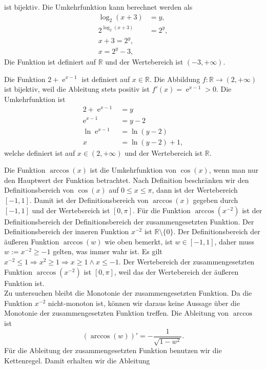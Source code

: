 {\begin{iii}
ist bijektiv.
Die Umkehrfunktion kann berechnet werden als
\begin{align*}
\log_2(x+3) &= y,\\
2^{\log_2(x+3)} & = 2^y,\\
x+3 = 2^y,\\
x = 2^y-3,
\end{align*}
Die Funktion ist definiert auf $\mathbb R$ und der Wertebereich ist $(-3, +\infty)$.
\item Die Funktion $2+\operatorname{e}^{x-1}$ ist definiert auf $x\in \mathbb R$. Die Abbildung $f: \mathbb R \to (2, +\infty)$ ist bijektiv,
weil die Ableitung stets positiv ist $f'(x) = \operatorname{e}^{x-1} > 0$.
%
Die Umkehrfunktion ist
\begin{align*}
2+\operatorname{e}^{x-1} &= y\\
\operatorname{e}^{x-1} & = y-2\\
\ln{\operatorname{e}^{x-1}}& = \ln{(y-2)}\\
x & = \ln{(y-2)}+1,
\end{align*}
welche definiert ist auf $x\in (2, +\infty)$ und der Wertebereich ist $\mathbb R$.
\item Die Funktion $\arccos(x)$ ist die Umkehrfunktion von $\cos(x)$, wenn man nur den Hauptwert der Funktion betrachtet. Nach Definition beschr\"anken wir den 
Definitionsbereich von $\cos(x)$ auf $0 \leq x \leq \pi$, dann ist der Wertebereich $[-1,1]$. Damit ist der Definitionsbereich von $\arccos(x)$ gegeben 
durch $[-1,1]$ und der Wertebereich ist $[0,\pi]$. F\"ur die Funktion $\arccos(x^{-2})$ ist der Definitionsbereich der Definitionsbereich der 
zusammengesetzten Funktion. Der Definitionsbereich der inneren Funktion $x^{-2}$ ist $\mathbb R \setminus \{0\}$. Der Definitionsbereich der 
\"au\ss eren Funktion $\arccos(w)$ wie oben bemerkt, ist $w\in[-1,1]$, daher muss $w:=x^{-2}\geq-1$ gelten, was immer wahr ist. Es gilt
$x^{-2} \leq 1 \Rightarrow x^2 \ge 1 \Rightarrow x \ge 1 \land x \leq -1$. Der Wertebereich der zusammengesetzten Funktion $\arccos(x^{-2})$ ist $[0,\pi]$, weil das 
der Wertebereich der \"au\ss eren Funktion ist.\\
Zu untersuchen bleibt die Monotonie der zusammengesetzten Funktion. Da die Funktion $x^{-2}$ nicht-monoton ist, k\"onnen wir daraus keine Aussage \"uber 
die Monotonie der zusammengesetzten Funktion treffen. Die Ableitung von $\arccos$ ist
$$(\arccos(w))' = -\frac{1}{\sqrt{1-w^2}}.$$
F\"ur die Ableitung der zusammengesetzten Funktion benutzen wir die Kettenregel. Damit erhalten wir die Ableitung
\begin{align*}

\end{align*}
\end{iii}}
